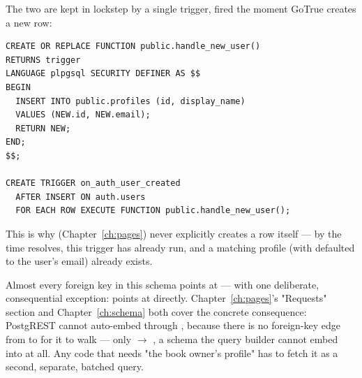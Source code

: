 The two are kept in lockstep by a single trigger, fired the moment GoTrue creates a new  row:

\begin{lstlisting}[style=olkcodesql, caption={The trigger that makes signup "just work" (see supabase/migrations/20260621123649...)}]
CREATE OR REPLACE FUNCTION public.handle_new_user()
RETURNS trigger
LANGUAGE plpgsql SECURITY DEFINER AS $$
BEGIN
  INSERT INTO public.profiles (id, display_name)
  VALUES (NEW.id, NEW.email);
  RETURN NEW;
END;
$$;

CREATE TRIGGER on_auth_user_created
  AFTER INSERT ON auth.users
  FOR EACH ROW EXECUTE FUNCTION public.handle_new_user();
\end{lstlisting}

This is why  (Chapter~\ref{ch:pages}) never explicitly creates a  row itself — by the time  resolves, this trigger has already run, and a matching profile (with  defaulted to the user's email) already exists.

\begin{olkwarn}
Almost every foreign key in this schema points at  — with one deliberate, consequential exception:  points at  directly. Chapter~\ref{ch:pages}'s "Requests" section and Chapter~\ref{ch:schema} both cover the concrete consequence: PostgREST cannot auto-embed  through , because there is no foreign-key edge from  to  for it to walk — only  $\to$ , a schema the query builder cannot embed into at all. Any code that needs "the book owner's profile" has to fetch it as a second, separate, batched query.
\end{olkwarn}
